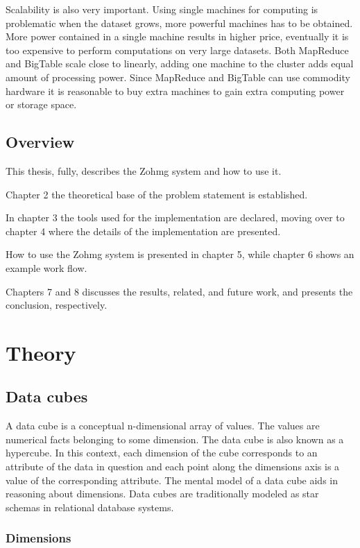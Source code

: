 \documentclass[a4paper,10pt]{book}
\begin{document}
Scalability is also very important. Using single machines for computing is
problematic when the dataset grows, more powerful machines has to be
obtained. More power contained in a single machine results in higher price,
eventually it is too expensive to perform computations on very large
datasets. Both MapReduce and BigTable scale close to linearly, adding one
machine to the cluster adds equal amount of processing power. Since
MapReduce and BigTable can use commodity hardware it is reasonable to buy
extra machines to gain extra computing power or storage space.


\section{Overview}

This thesis, fully, describes the Zohmg system and how to use it.

Chapter 2 the theoretical base of the problem statement is established.

In chapter 3 the tools used for the implementation are declared, moving
over to chapter 4 where the details of the implementation are presented.

How to use the Zohmg system is presented in chapter 5, while chapter 6
shows an example work flow.

Chapters 7 and 8 discusses the results, related, and future work, and
presents the conclusion, respectively.




\chapter{Theory}

\section{Data cubes}

A data cube is a conceptual n-dimensional array of values. The values are numerical facts belonging to some dimension. The data cube is also known as a hypercube. In this context, each dimension of the cube corresponds to an attribute of the data in question and each point along the dimensions axis is a value of the corresponding attribute. The mental model of a data cube aids in reasoning about dimensions. Data cubes are traditionally modeled as star schemas in relational database systems.

\subsection{Dimensions}
\end{document}
